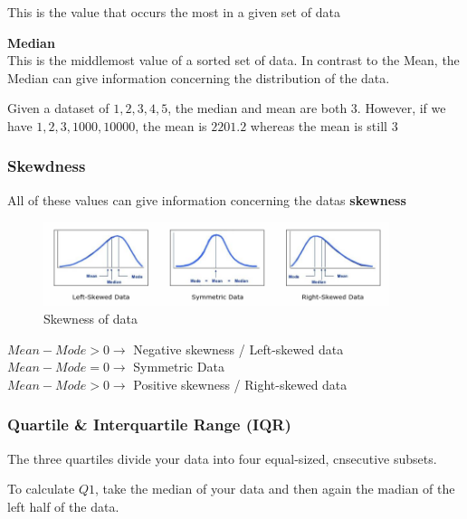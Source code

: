 \documentclass[a4paper, 11pt]{article}
\begin{document}
This is the value that occurs the most in a given set of data

\vspace{10px}

\noindent \textbf{Median} \\

This is the middlemost value of a sorted set of data. In contrast to the Mean, the Median can give information concerning the distribution of the data.

Given a dataset of $1, 2, 3, 4, 5$, the median and mean are both $3$. However, if we have $1, 2, 3, 1000, 10000$, the mean is $2201.2$ whereas the mean is still $3$ 

\newpage

\subsubsection{Skewdness}

All of these values can give information concerning the datas \textbf{skewness}

\begin{figure}[htb!]
    \centering
    \includegraphics[keepaspectratio=true, width=0.9\textwidth]{skewness.png}
    \caption{Skewness of data}
    \label{fig:skewness}
\end{figure}

\noindent    
$Mean - Mode > 0 \rightarrow$ Negative skewness / Left-skewed data \\
$Mean - Mode = 0 \rightarrow$ Symmetric Data \\
$Mean - Mode > 0 \rightarrow$ Positive skewness / Right-skewed data

\vspace{10px}

\subsubsection{Quartile \& Interquartile Range (IQR)}

The three quartiles divide your data into four equal-sized, cnsecutive subsets.

To calculate $Q1$, take the median of your data and then again the madian of the left half of the data.
\end{document}
